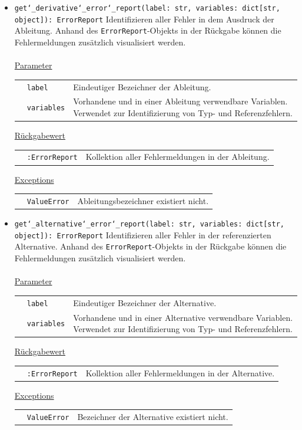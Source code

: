 \documentclass{article}
\begin{document}
\begin{itemize}
\item \texttt{get\char`_derivative\char`_error\char`_report(label: str, variables: dict[str, object]): ErrorReport} \newline Identifizieren aller Fehler in dem Ausdruck der Ableitung. Anhand des \texttt{ErrorReport}-Objekts in der Rückgabe können die Fehlermeldungen zusätzlich visualisiert werden.
\\\\
\underline{{Parameter}}

\begin{tabular}{lll}
 & \texttt{label} & Eindeutiger Bezeichner der Ableitung. \\
 & \texttt{variables} & Vorhandene und in einer Ableitung verwendbare Variablen. Verwendet zur Identifizierung von Typ- und Referenzfehlern. \\
\end{tabular}

\underline{{Rückgabewert}}

\begin{tabular}{lll}
 & \texttt{:ErrorReport} & Kollektion aller Fehlermeldungen in der Ableitung. \\
\end{tabular}

\underline{Exceptions}\\
\begin{tabular}{lll}
 & \texttt{ValueError} & Ableitungsbezeichner existiert nicht.\\
\end{tabular}


\item \texttt{get\char`_alternative\char`_error\char`_report(label: str, variables: dict[str, object]): ErrorReport} \newline Identifizieren aller Fehler in der referenzierten Alternative. Anhand des \texttt{ErrorReport}-Objekts in der Rückgabe können die Fehlermeldungen zusätzlich visualisiert werden.
\\\\
\underline{{Parameter}}

\begin{tabular}{lll}
 & \texttt{label} & Eindeutiger Bezeichner der Alternative. \\
 & \texttt{variables} & Vorhandene und in einer Alternative verwendbare Variablen. Verwendet zur Identifizierung von Typ- und Referenzfehlern. \\
\end{tabular}

\underline{{Rückgabewert}}

\begin{tabular}{lll}
 & \texttt{:ErrorReport} & Kollektion aller Fehlermeldungen in der Alternative. \\
\end{tabular}

\underline{Exceptions}\\
\begin{tabular}{lll}
 & \texttt{ValueError} & Bezeichner der Alternative existiert nicht.\\
\end{tabular}
\end{itemize}
\end{document}
